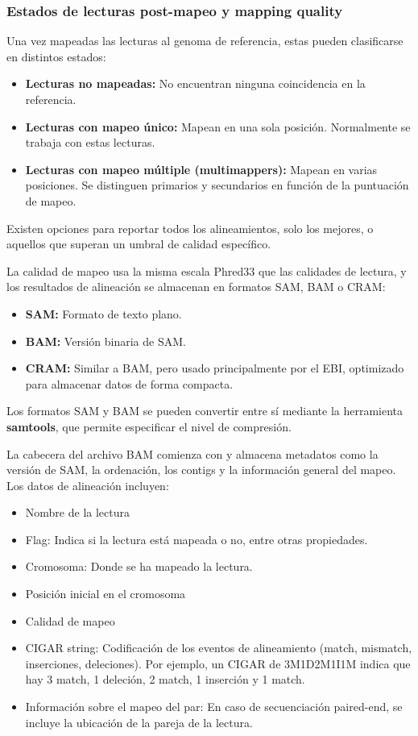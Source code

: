 \subsubsection{Estados de lecturas post-mapeo y mapping quality}
Una vez mapeadas las lecturas al genoma de referencia, estas pueden clasificarse en distintos estados:
\begin{itemize}
\item \textbf{Lecturas no mapeadas:} No encuentran ninguna coincidencia en la referencia.
\item \textbf{Lecturas con mapeo único:} Mapean en una sola posición. Normalmente se trabaja con estas lecturas.
\item \textbf{Lecturas con mapeo múltiple (multimappers):} Mapean en varias posiciones. Se distinguen primarios y secundarios en función de la puntuación de mapeo.
\end{itemize}

Existen opciones para reportar todos los alineamientos, solo los mejores, o aquellos que superan un umbral de calidad específico.

La calidad de mapeo usa la misma escala Phred33 que las calidades de lectura, y los resultados de alineación se almacenan en formatos SAM, BAM o CRAM:
\begin{itemize}
\item \textbf{SAM:} Formato de texto plano.
\item \textbf{BAM:} Versión binaria de SAM.
\item \textbf{CRAM:} Similar a BAM, pero usado principalmente por el EBI, optimizado para almacenar datos de forma compacta.
\end{itemize}

Los formatos SAM y BAM se pueden convertir entre sí mediante la herramienta \textbf{samtools}, que permite especificar el nivel de compresión.

La cabecera del archivo BAM comienza con \@ y almacena metadatos como la versión de SAM, la ordenación, los contigs y la información general del mapeo. Los datos de alineación incluyen: 
\begin{itemize} 
\item Nombre de la lectura 
\item Flag: Indica si la lectura está mapeada o no, entre otras propiedades. 
\item Cromosoma: Donde se ha mapeado la lectura. 
\item Posición inicial en el cromosoma 
\item Calidad de mapeo 
\item CIGAR string: Codificación de los eventos de alineamiento (match, mismatch, inserciones, deleciones). Por ejemplo, un CIGAR de 3M1D2M1I1M indica que hay 3 match, 1 deleción, 2 match, 1 inserción y 1 match.
\item Información sobre el mapeo del par: En caso de secuenciación paired-end, se incluye la ubicación de la pareja de la lectura. 
\end{itemize}

